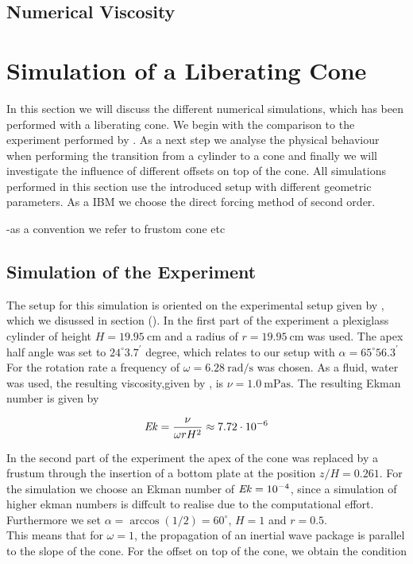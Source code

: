 \subsection{Numerical Viscosity}

\newpage

\section{Simulation of a Liberating Cone}

In this section we will discuss the different numerical simulations, which has been performed
with a liberating cone. We begin with the comparison to the experiment performed by \citep{Beardsley1970}.
As a next step we analyse the physical behaviour when performing the transition from a cylinder
to a cone and finally  we will investigate the influence of different offsets on top of the cone.
All simulations performed in this section use the introduced setup with different geometric parameters.
As a IBM we choose the direct forcing  method of second order.

-as a convention we refer to frustom cone etc

\subsection{Simulation of the Experiment}

The setup for this simulation is oriented on the experimental setup given by \citep{Beardsley1970}, which
we disussed in section ().
In the first part of the experiment a plexiglass cylinder of height $H=\SI{19.95}{\centi\meter}$ and a radius of
$r=\SI{19.95}{\centi\meter}$ was used. The apex half angle was set to $24^{\circ}3.7^{\prime}$ degree,
which relates to our setup with $\alpha=65^{\circ}56.3^{\prime}$
For the rotation rate a frequency of $\omega =\SI{6.28}{\radian\per\second}$ was chosen.
As a fluid, water was used, the resulting viscosity,given by \citep{tipler2003}, is $\nu = \SI{1.0}{\milli\pascal\second}$.
The resulting Ekman number is given by

\begin{align}
    \mbox{\textit{Ek}} = \frac{\nu}{\omega r H^2} \approx 7.72\cdot 10^{-6}
\end{align}

In the second part of the experiment the apex of the cone was replaced by a frustum through the
insertion of a bottom plate at the position $z/H = 0.261$.
For the simulation we choose an Ekman number of $\mbox{\textit{Ek}} =  10^{-4}$, since a simulation of higher ekman numbers is
diffcult to realise due to the computational effort.
Furthermore we set $\alpha = \arccos(1/2) = 60^{\circ}$, $H=1$ and $r=0.5$.\\
This means that for $\omega=1$, the propagation of an inertial wave package is parallel to the slope of the cone.
For the offset on top of the cone, we obtain the condition

